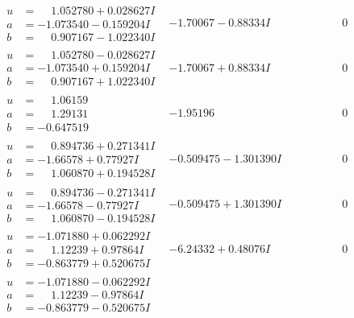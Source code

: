 \documentclass[1p]{elsarticle_modified}
\theoremstyle{definition}
\begin{document}
$$\begin{array}{c|c|c}
\begin{aligned}
u &= \phantom{-}1.052780 + 0.028627 I \\
a &= -1.073540 - 0.159204 I \\
b &= \phantom{-}0.907167 - 1.022340 I\end{aligned}
 & -1.70067 - 0.88334 I & \phantom{-0.000000 } 0 \\ \hline\begin{aligned}
u &= \phantom{-}1.052780 - 0.028627 I \\
a &= -1.073540 + 0.159204 I \\
b &= \phantom{-}0.907167 + 1.022340 I\end{aligned}
 & -1.70067 + 0.88334 I & \phantom{-0.000000 } 0 \\ \hline\begin{aligned}
u &= \phantom{-}1.06159\phantom{ +0.000000I} \\
a &= \phantom{-}1.29131\phantom{ +0.000000I} \\
b &= -0.647519\phantom{ +0.000000I}\end{aligned}
 & -1.95196\phantom{ +0.000000I} & \phantom{-0.000000 } 0 \\ \hline\begin{aligned}
u &= \phantom{-}0.894736 + 0.271341 I \\
a &= -1.66578 + 0.77927 I \\
b &= \phantom{-}1.060870 + 0.194528 I\end{aligned}
 & -0.509475 - 1.301390 I & \phantom{-0.000000 } 0 \\ \hline\begin{aligned}
u &= \phantom{-}0.894736 - 0.271341 I \\
a &= -1.66578 - 0.77927 I \\
b &= \phantom{-}1.060870 - 0.194528 I\end{aligned}
 & -0.509475 + 1.301390 I & \phantom{-0.000000 } 0 \\ \hline\begin{aligned}
u &= -1.071880 + 0.062292 I \\
a &= \phantom{-}1.12239 + 0.97864 I \\
b &= -0.863779 + 0.520675 I\end{aligned}
 & -6.24332 + 0.48076 I & \phantom{-0.000000 } 0 \\ \hline\begin{aligned}
u &= -1.071880 - 0.062292 I \\
a &= \phantom{-}1.12239 - 0.97864 I \\
b &= -0.863779 - 0.520675 I\end{aligned}

\end{array}$$
\end{document}
